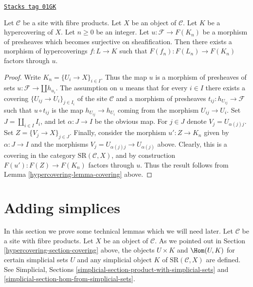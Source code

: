 \begin{lemma}
\label{hypercovering-lemma-covering-sheaf}
\href{https://stacks.math.columbia.edu/tag/01GK}{\texttt{Stacks tag 01GK}}

Let $\mathcal{C}$ be a site with fibre products.
Let $X$ be an object of $\mathcal{C}$.
Let $K$ be a hypercovering of $X$.
Let $n \geq 0$ be an integer.
Let $u : \mathcal{F} \to F(K_n)$ be a morphism
of presheaves which becomes surjective
on sheafification.
Then there exists a morphism of hypercoverings
$f: L \to K$ such that $F(f_n) : F(L_n) \to F(K_n)$
factors through $u$.
\end{lemma}

\begin{proof}

Write $K_n = \{U_i \to X\}_{i \in I}$.
Thus the map $u$ is a morphism of presheaves of sets
$u : \mathcal{F} \to \amalg h_{u_i}$.
The assumption on $u$ means that for every
$i \in I$ there exists a covering $\{U_{ij} \to U_i\}_{j \in I_i}$
of the site $\mathcal{C}$ and a morphism of presheaves
$t_{ij} : h_{U_{ij}} \to \mathcal{F}$ such that
$u \circ t_{ij}$ is the map $h_{U_{ij}} \to h_{U_i}$
coming from the morphism $U_{ij} \to U_i$.
Set $J = \amalg_{i \in I} I_i$, and let
$\alpha : J \to I$ be the obvious map.
For $j \in J$ denote $V_j = U_{\alpha(j)j}$. Set
$Z = \{V_j \to X\}_{j \in J}$.
Finally, consider the morphism
$u' : Z \to K_n$ given by $\alpha : J \to I$
and the morphisms $V_j = U_{\alpha(j)j} \to U_{\alpha(j)}$
above. Clearly, this is a covering in the
category $\text{SR}(\mathcal{C}, X)$, and by
construction $F(u') : F(Z) \to F(K_n)$ factors through $u$.
Thus the result follows from Lemma \ref{hypercovering-lemma-covering} above.
\end{proof}

\section{Adding simplices}
\label{hypercovering-section-adding-simplices}
In this section we prove some technical lemmas which we will need later.
Let $\mathcal{C}$ be a site with fibre products.
Let $X$ be an object of $\mathcal{C}$.
As we pointed out in Section \ref{hypercovering-section-covering} above,
the objects $U \times K$ and $\Hom(U, K)$
for certain simplicial sets $U$
and any simplicial object $K$ of $\text{SR}(\mathcal{C}, X)$
are defined. See Simplicial, Sections
\ref{simplicial-section-product-with-simplicial-sets} and
\ref{simplicial-section-hom-from-simplicial-sets}.

